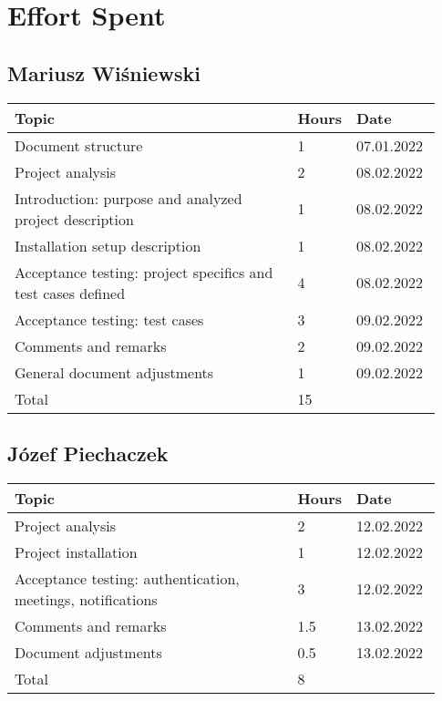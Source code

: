 \chapter{Effort Spent}

\section*{Mariusz Wiśniewski}
\begin{longtable}{@{}p{0.67\linewidth} p{0.06\linewidth} p{0.20\linewidth}@{}}
    \toprule[1.5pt]
    Topic & Hours & Date\\ \hline
    Document structure & 1 & 07.01.2022\\ 
    Project analysis & 2 & 08.02.2022\\
    Introduction: purpose and analyzed project description & 1 & 08.02.2022\\ 
    Installation setup description & 1 & 08.02.2022\\
    Acceptance testing: project specifics and test cases defined & 4 & 08.02.2022\\
    Acceptance testing: test cases & 3 & 09.02.2022\\
    Comments and remarks & 2 & 09.02.2022\\
    General document adjustments & 1 & 09.02.2022\\
    \hline
    Total & 15 &\\ 
    \bottomrule[1.5pt]
\end{longtable}

\section*{Józef Piechaczek}
\begin{longtable}{@{}p{0.67\linewidth} p{0.06\linewidth} p{0.20\linewidth}@{}}
    \toprule[1.5pt]
    Topic &  Hours & Date \\ \hline
    Project analysis & 2 & 12.02.2022\\
    Project installation & 1 & 12.02.2022\\
    Acceptance testing: authentication, meetings, notifications & 3 & 12.02.2022\\
    Comments and remarks & 1.5 & 13.02.2022\\
    Document adjustments & 0.5 & 13.02.2022\\
    \hline
    Total & 8 & \\
    \bottomrule[1.5pt]
\end{longtable}

